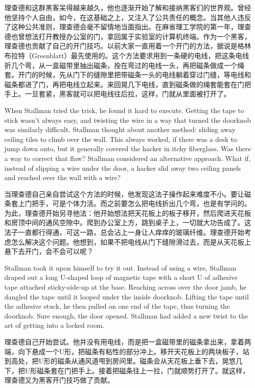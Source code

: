 \ifdefined\chs
理查德和这群黑客呆得越来越久，他也逐渐开始了解和接纳黑客们的世界观。曾经他坚持个人自由，如今，在这基础之上，又注入了公共责任的概念。当其他人违反了这种公共准则，理查德会毫不留情地当面指出。在麻省理工学院的第一年，理查德也曾想法打开教授办公室的门，拿回属于实验室的计算机终端。作为一个黑客，理查德也贡献了自己的开门技巧。以前大家一直用着一个开门的方法，据说是格林布拉特（Greenblatt）最先使用的。这个方法要求用到一条硬的电线，把这条电线折几个弯，从一盒磁带里抽出磁条，拴在弯过的电线一头，再把磁条做成一个绳套。开门的时候，先从门下的缝隙里把带磁条一头的电线躺着穿过门缝，等电线和磁条都进了门，再把电线立起来。来回晃几下电线，直到磁条做的绳套能套在门把手上。一旦套紧，黑客就可以把电线往后拉，这样，门就从里面被打开了。
\fi

\ifdefined\eng
When Stallman tried the trick, he found it hard to execute. Getting the tape to stick wasn't always easy, and twisting the wire in a way that turned the doorknob was similarly difficult. Stallman thought about another method: sliding away ceiling tiles to climb over the wall. This always worked, if there was a desk
to jump down onto, but it generally covered the hacker in itchy fiberglass.  Was there a way to correct that flaw?  Stallman considered an alternative approach. What if, instead of slipping a wire under the door, a hacker slid away two ceiling panels and reached over the wall with a wire?
\fi

\ifdefined\chs
当理查德自己亲自尝试这个方法的时候，他发现这法子操作起来难度不小。要让磁条套上门把手，可是个体力活。而之前要怎么把电线折出几个弯，也是有学问的。为此，理查德开始另寻他法：他开始想法把天花板上的板子移开，然后爬进天花板和房顶中间的通风空隙中。爬到办公室上方，跳到桌子上，一切就大功告成了。这法子一直都行得通，可这一路，总会沾上一身让人痒痒的玻璃纤维。理查德开始考虑怎么解决这个问题。他想到，如果不把电线从门下缝隙滑过去，而是从天花板上悬下去开门，会不会可以呢？
\fi

\ifdefined\eng
Stallman took it upon himself to try it out. Instead of using a wire, Stallman draped out a long U-shaped loop of magnetic tape with a short U of adhesive tape attached sticky-side-up at the base. Reaching across over the door jamb, he dangled the tape until it looped under the inside doorknob. Lifting the tape until the adhesive stuck, he then pulled on one end of the tape, thus turning the doorknob. Sure enough, the door opened. Stallman had added a new twist to the art of getting into a locked room.
\fi

\ifdefined\chs
理查德自己开始尝试。他并没有用电线，而是把一盒磁带里的磁条拿出来，拿着两端，向下悬成一个U形，把磁条有粘性的部分冲上。移开天花板上的两块板子，站到高处，把U形的磁条从通风道甩到房间里。磁条会从天花板上垂下去，晃悠几下，把U形磁条套在门把手上。接着把磁条往上一拉，门就顺势打开了。就这样，理查德又为黑客开门技巧做了贡献。
\fi

